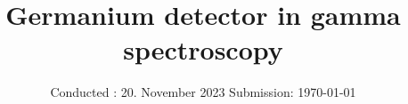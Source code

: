 

\subject{V18}
\title{Germanium detector in  gamma spectroscopy}
\date{%
  Conducted : 20. November 2023
  \hspace{3em}
  Submission: \today
}



\maketitle
\thispagestyle{empty}
\tableofcontents
\newpage








\printbibliography{}
%


